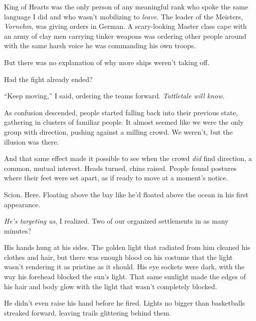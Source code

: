 King of Hearts was the only person of any meaningful rank who spoke the same language I did and who wasn't mobilizing to \emph{leave}.  The leader of the Meisters, \emph{Vornehm}, was giving orders in German.  A scary-looking Master class cape with an army of clay men carrying tinker weapons was ordering other people around with the same harsh voice he was commanding his own troops.



But there was no explanation of why more ships weren't taking off.



Had the fight already ended?



``Keep moving,'' I said, ordering the teams forward.  \emph{Tattletale will know}.



As confusion descended, people started falling back into their previous state, gathering in clusters of familiar people.  It almost seemed like we were the only group with direction, pushing against a milling crowd.  We weren't, but the illusion was there.



And that same effect made it possible to see when the crowd \emph{did} find direction, a common, mutual interest.  Heads turned, chins raised.  People found postures where their feet were set apart, as if ready to move at a moment's notice.



Scion.  Here.  Floating above the bay like he'd floated above the ocean in his first appearance.



\emph{He's targeting us}, I realized.  Two of our organized settlements in as many minutes?



His hands hung at his sides.  The golden light that radiated from him cleaned his clothes and hair, but there was enough blood on his costume that the light wasn't rendering it as pristine as it should.  His eye sockets were dark, with the way his forehead blocked the sun's light.  That same sunlight made the edges of his hair and body glow with the light that wasn't completely blocked.



He didn't even raise his hand before he fired.  Lights no bigger than basketballs streaked forward, leaving trails glittering behind them.



